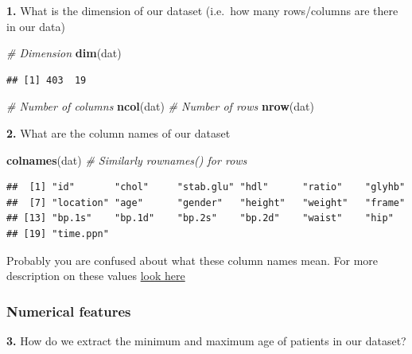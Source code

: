 \documentclass[
]{book}
\newenvironment{Shaded}{\begin{snugshade}}{\end{snugshade}}
\newcommand{\CommentTok}[1]{\textcolor[rgb]{0.56,0.35,0.01}{\textit{#1}}}
\newcommand{\FunctionTok}[1]{\textcolor[rgb]{0.13,0.29,0.53}{\textbf{#1}}}
\newcommand{\NormalTok}[1]{#1}
\newcommand{\SpecialCharTok}[1]{\textcolor[rgb]{0.81,0.36,0.00}{\textbf{#1}}}
\begin{document}
\textbf{1.} What is the dimension of our dataset (i.e.~how many rows/columns are there in our data)

\begin{Shaded}
\begin{Highlighting}[]
\CommentTok{\# Dimension}
\FunctionTok{dim}\NormalTok{(dat)}
\end{Highlighting}
\end{Shaded}

\begin{verbatim}
## [1] 403  19
\end{verbatim}

\begin{Shaded}
\begin{Highlighting}[]
\CommentTok{\# Number of columns}
\FunctionTok{ncol}\NormalTok{(dat)}
\CommentTok{\# Number of rows}
\FunctionTok{nrow}\NormalTok{(dat)}
\end{Highlighting}
\end{Shaded}

\textbf{2.} What are the column names of our dataset

\begin{Shaded}
\begin{Highlighting}[]
\FunctionTok{colnames}\NormalTok{(dat) }\CommentTok{\# Similarly rownames() for rows}
\end{Highlighting}
\end{Shaded}

\begin{verbatim}
##  [1] "id"       "chol"     "stab.glu" "hdl"      "ratio"    "glyhb"   
##  [7] "location" "age"      "gender"   "height"   "weight"   "frame"   
## [13] "bp.1s"    "bp.1d"    "bp.2s"    "bp.2d"    "waist"    "hip"     
## [19] "time.ppn"
\end{verbatim}

Probably you are confused about what these column names mean.
For more description on these values \href{https://biostat.app.vumc.org/wiki/pub/Main/DataSets/Cdiabetes.html}{look here}

\hypertarget{numerical-features}{%
\subsubsection{Numerical features}\label{numerical-features}}

\textbf{3.} How do we extract the minimum and maximum age of patients in our dataset?

\begin{Shaded}
\end{Shaded}
\end{document}
